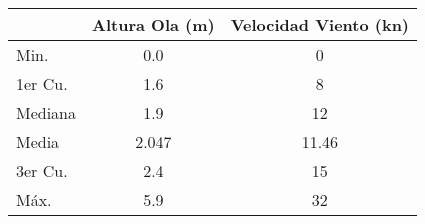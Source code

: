 \begin{tabular}{lS[table-format=1.3]S[table-format=2.3]}
    \toprule
    & {Altura Ola (\si{\meter})} & {Velocidad Viento (\si{\knot})} \\
    \midrule
    Min.    &0.0      &  0    \\
    1er Cu.  &1.6    &  8    \\
    Mediana &1.9    & 12    \\
    Media   &2.047  & 11.46 \\
    3er Cu.  &2.4    & 15    \\
    Máx.    &5.9    & 32    \\
    \bottomrule
\end{tabular}
